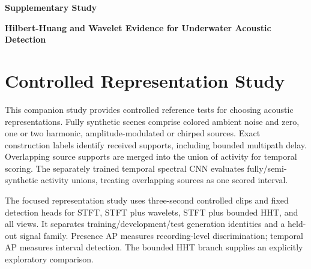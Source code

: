\documentclass[11pt,letterpaper]{article}
\newcommand{\drafttitle}[1]{\begin{center}\sffamily\bfseries\fontsize{16}{19}\selectfont #1\end{center}}
\begin{document}
\fontsize{11}{13}\selectfont

\nocite{portia,huang1998,flowmatching}

\drafttitle{Supplementary Study}

\begin{center}\sffamily\bfseries Hilbert-Huang and Wavelet Evidence for Underwater Acoustic Detection\end{center}

\section{Controlled Representation Study}

This companion study provides controlled reference tests for choosing acoustic representations. Fully synthetic scenes comprise colored ambient noise and zero, one or two harmonic, amplitude-modulated or chirped sources. Exact construction labels identify received supports, including bounded multipath delay. Overlapping source supports are merged into the union of activity for temporal scoring. The separately trained temporal spectral CNN evaluates fully/semi-synthetic activity unions, treating overlapping sources as one scored interval.\par

The focused representation study uses three-second controlled clips and fixed detection heads for STFT, STFT plus wavelets, STFT plus bounded HHT, and all views. It separates training/development/test generation identities and a held-out signal family. Presence AP measures recording-level discrimination; temporal AP measures interval detection. The bounded HHT branch supplies an explicitly exploratory comparison.\par
\end{document}

